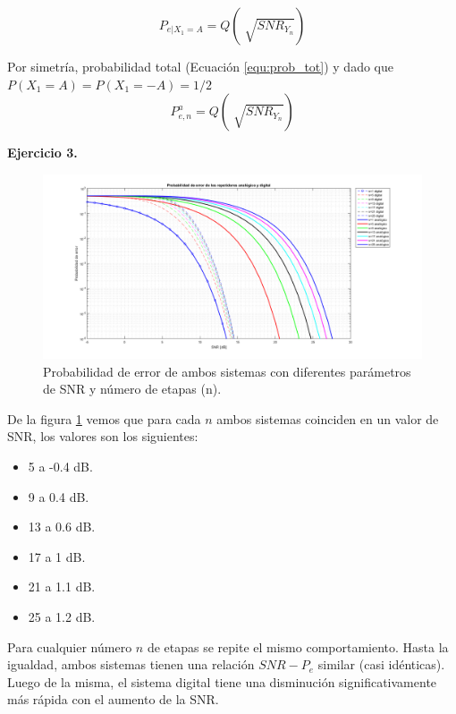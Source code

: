 \begin{equation}
P_{e|X_1 = A} = Q(\sqrt[]{SNR_{Y_n}})
\end{equation}

Por simetría, probabilidad total (Ecuación \ref{equ:prob_tot}) y dado que $P(X_1=A) = P(X_1=-A) = 1/2$\\

\begin{equation}
P_{e,n}^a = Q(\sqrt[]{SNR_{Y_n}})
\end{equation}


\hfill

\textbf{Ejercicio 3.}

\begin{figure}[H]
  \centering
  \includegraphics[width=1\textwidth]{images/Pe_pto3_1}
  \caption{Probabilidad de error de ambos sistemas con diferentes parámetros de SNR y número de etapas (n).}
  \label{fig:pto3_1}
\end{figure}

\hfill

De la figura \ref{fig:pto3_1} vemos que para cada $n$ ambos sistemas coinciden en un valor de SNR, los valores son los siguientes:

\begin{itemize}
\item 5 a -0.4 dB.
\item 9 a 0.4 dB.
\item 13 a 0.6 dB.
\item 17 a 1 dB.
\item 21 a 1.1 dB.
\item 25 a 1.2 dB.
\end{itemize}

Para cualquier número $n$ de etapas se repite el mismo comportamiento. Hasta la igualdad, ambos sistemas tienen una relación $SNR-P_e$ similar (casi idénticas). Luego de la misma, el sistema digital tiene una disminución significativamente más rápida con el aumento de la SNR.\\

